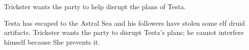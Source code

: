 Trickster wants the party to help disrupt the plans of Testa.

Testa has escaped to the Astral Sea and his followers have stolen some elf druid artifacts.
Trickster wants the party to disrupt Testa's plans; he cannot interfere himself because She prevents it.